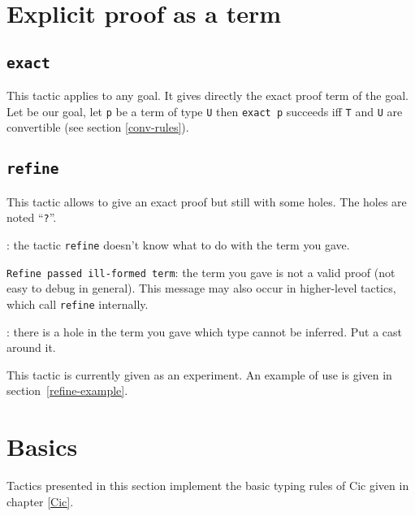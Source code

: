 \section{Explicit proof as a term}

\subsection{\tt exact \term}
\label{exact}
This tactic applies to any goal. It gives directly the exact proof
term of the goal. Let {\T} be our goal, let {\tt p} be a term of type
{\tt U} then {\tt exact p} succeeds iff {\tt T} and {\tt U} are
convertible (see section \ref{conv-rules}).

\begin{ErrMsgs}
\item {}
\end{ErrMsgs}


\subsection{\tt refine \term}
\label{refine}

This tactic allows to give an exact proof but still with some
holes. The holes are noted ``\texttt{?}''.

\begin{ErrMsgs}
\item {}: 
  the tactic \texttt{refine} doesn't know what to do
  with the term you gave.
\item \texttt{Refine passed ill-formed term}: the term you gave is not
  a valid proof (not easy to debug in general).
  This message may also occur in higher-level tactics, which call 
  \texttt{refine} internally.
\item {}: 
  there is a hole in the term you gave
  which type cannot be inferred. Put a cast around it.
\end{ErrMsgs}

This tactic is currently given as an experiment. An example of use is given
in section~\ref{refine-example}.

\section{Basics}
Tactics presented in this section implement the basic typing rules of
{\sc Cic} given in chapter \ref{Cic}.

